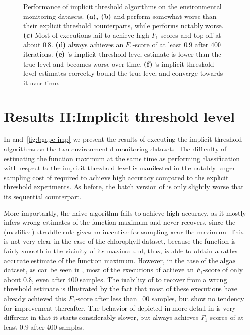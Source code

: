 \begin{figure*}[tb]
  \caption{Performance of implicit threshold algorithms on the environmental
           monitoring datasets.
           \textbf{(a), (b)} \iacl and \ibacl perform somewhat worse than their
           explicit threshold counterparts, while \istr performs notably worse.
           \textbf{(c)} Most of \istr executions fail to achieve high
           $F_1$-scores and top off at about $0.8$.
           \textbf{(d)} \iacl always achieves an $F_1$-score of at least $0.9$
           after $400$ iterations.
           \textbf{(e)} \istr's implicit threshold level estimate is lower than
           the true level and becomes worse over time.
           \textbf{(f)} \iacl's implicit threshold level estimates correctly bound
           the true level and converge towards it over time.
           }
  \label{fig:exp}
\end{figure*}

\section{Results II:\hspace{0.33em}Implicit threshold level}
In  and~\ref{fig:bgape-imp} we present the results of
executing the implicit threshold algorithms on the two
environmental monitoring datasets. The difficulty of estimating the
function maximum at the same time as performing classification with respect to
the implicit threshold level is manifested in the notably larger sampling cost
of \iacl required to achieve high accuracy compared to the explicit threshold
experiments. As before, the batch version of
\iacl is only slightly worse that its sequential counterpart.

More importantly, the naive \istr algorithm
fails to achieve high accuracy, as it mostly infers wrong estimates of
the function maximum and never recovers, since the (modified) straddle rule
gives no incentive for sampling near the maximum.
This is not very clear in the case of the chlorophyll dataset, because
the function is fairly smooth in the vicinity of its maxima and, thus,
\istr is able to obtain a rather accurate estimate of the function
maximum.
However, in the case of the algae dataset,
as can be seen in , most
of the executions of \istr achieve an $F_1$-score of only about
0.8, even after $400$ samples. The inability of \istr to recover from a wrong
threshold estimate is illustrated by the fact that most of these executions
have already achieved this $F_1$-score after less than $100$ samples, but show
no tendency for improvement thereafter. The behavior of \iacl depicted in
more detail in  is very different
in that it starts considerably slower, but always achieves $F_1$-scores of
at least $0.9$ after $400$ samples.

